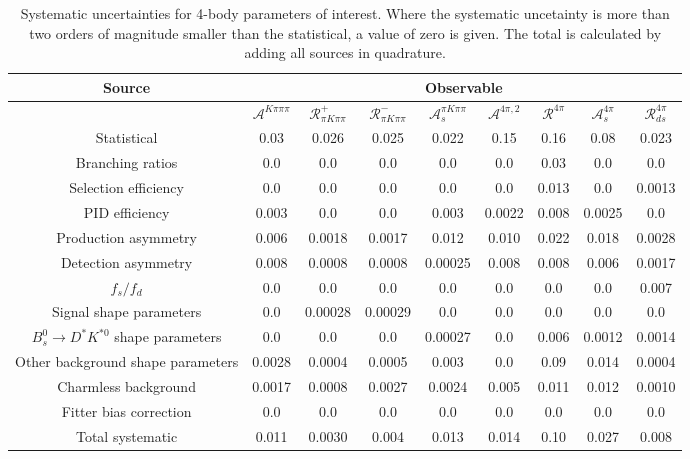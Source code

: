 \begin{sidewaystable}
  \centering
  \begin{tabular}{ccccccccc}
      \toprule
      Source & \multicolumn{8}{c}{Observable} \\
      \midrule
       & $\mathcal{A}^{K\pi\pi\pi}$ & $\mathcal{R}_{\pi K\pi\pi}^+$ & $\mathcal{R}_{\pi K\pi\pi}^-$ & $\mathcal{A}_s^{\pi K\pi\pi}$ & $\mathcal{A}^{4\pi,2}$ & $\mathcal{R}^{4\pi}$ & $\mathcal{A}_s^{4\pi}$ & $\mathcal{R}_{ds}^{4\pi}$ \\
      \midrule
      Statistical & 0.03 & 0.026 & 0.025 & 0.022 & 0.15 & 0.16 & 0.08 & 0.023 \\
      \midrule
      Branching ratios & 0.0  & 0.0  & 0.0  & 0.0  & 0.0  & 0.03 & 0.0  & 0.0  \\
      Selection efficiency & 0.0  & 0.0  & 0.0  & 0.0  & 0.0  & 0.013 & 0.0  & 0.0013 \\
      PID efficiency & 0.003 & 0.0  & 0.0  & 0.003 & 0.0022 & 0.008 & 0.0025 & 0.0  \\
      Production asymmetry & 0.006 & 0.0018 & 0.0017 & 0.012 & 0.010 & 0.022 & 0.018 & 0.0028 \\
      Detection asymmetry & 0.008 & 0.0008 & 0.0008 & 0.00025 & 0.008 & 0.008 & 0.006 & 0.0017 \\
      $f_s/f_d$ & 0.0  & 0.0  & 0.0  & 0.0  & 0.0  & 0.0  & 0.0  & 0.007 \\
      Signal shape parameters & 0.0  & 0.00028 & 0.00029 & 0.0  & 0.0  & 0.0  & 0.0  & 0.0  \\
      $B^0_s \to D^* K^{*0}$ shape parameters & 0.0  & 0.0  & 0.0  & 0.00027 & 0.0  & 0.006 & 0.0012 & 0.0014 \\
      Other background shape parameters & 0.0028 & 0.0004 & 0.0005 & 0.003 & 0.0  & 0.09 & 0.014 & 0.0004 \\
      Charmless background & 0.0017 & 0.0008 & 0.0027 & 0.0024 & 0.005 & 0.011 & 0.012 & 0.0010 \\
      Fitter bias correction & 0.0  & 0.0  & 0.0  & 0.0  & 0.0  & 0.0  & 0.0  & 0.0  \\
      \midrule
      Total systematic & 0.011 & 0.0030 & 0.004 & 0.013 & 0.014 & 0.10 & 0.027 & 0.008 \\
      \bottomrule
  \end{tabular}
  \caption{Systematic uncertainties for 4-body parameters of interest. Where the systematic uncetainty is more than two orders of magnitude smaller than the statistical, a value of zero is given. The total is calculated by adding all sources in quadrature.}
\label{tab:fourBody_systematics}
\end{sidewaystable}
